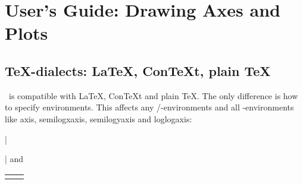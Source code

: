 
\section{User's Guide: Drawing Axes and Plots}
\subsection{\TeX-dialects: \LaTeX, Con{\TeX}t, plain \TeX }
\label{sec:tex:dialects}%
\PGFPlots\ is compatible with \LaTeX, Con{\TeX}t and plain \TeX. The only difference is how to specify environments. This affects any \PGF/\Tikz-environments and all \PGFPlots-environments like axis, semilogxaxis, semilogyaxis and loglogaxis:
\begin{description}
\def\HEAD{%
	\small
	\begin{tabular}{*{2}{p{4cm}}}%
}%
\item[\LaTeX:] |\usepackage{pgfplots}| and

{\HEAD
\begin{codeexample}
\begin{tikzpicture}
\begin{axis}
...
\end{axis}
\end{tikzpicture}
\end{codeexample}
&
\begin{codeexample}
\begin{tikzpicture}
\begin{semilogxaxis}
...
\end{semilogxaxis}
\end{tikzpicture}
\end{codeexample}
\\
\end{tabular}%
}

\end{description}
